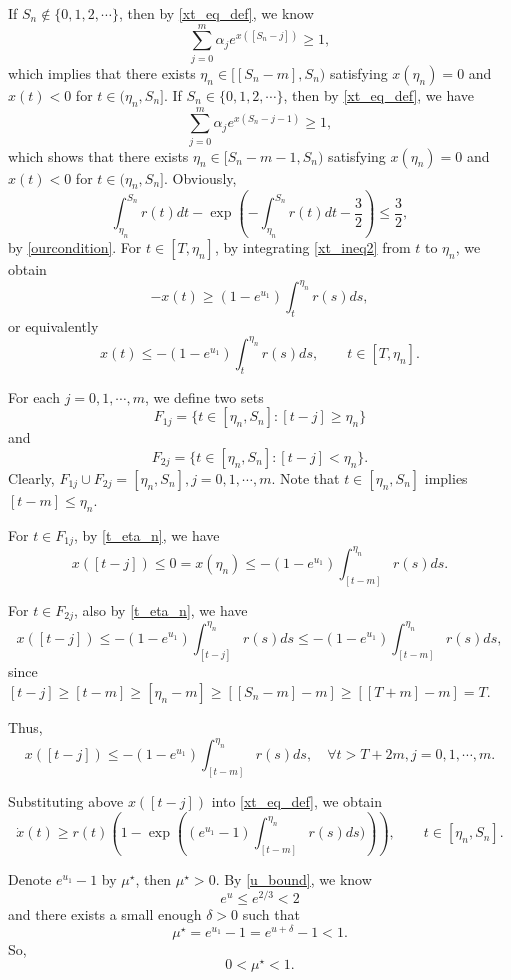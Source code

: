 \documentclass{HZNUMCM}
\begin{document}
If $S_n\notin\{0,1,2,\cdots\}$, then by \eqref{xt_eq_def}, we know
$$
\sum_{j=0}^{m} \alpha_je^{x([S_n-j])}\geqslant1,
$$
which implies that there exists $\eta_n\in [[S_n-m],S_n)$ satisfying $x(\eta_n)=0$ and $x(t)<0$ for $t\in(\eta_n,S_n]$.
If $S_n\in\{0,1,2,\cdots\}$, then by \eqref{xt_eq_def}, we have
$$
\sum_{j=0}^{m} \alpha_je^{x(S_n-j-1)}\geqslant1,
$$which shows that there exists $\eta_n\in [S_n-m-1,S_n)$ satisfying $x(\eta_n)=0$ and $x(t)<0$ for $t\in(\eta_n,S_n]$. Obviously,
\begin{equation}
\int_{\eta_n}^{S_n}r(t)dt-\exp(-\int_{\eta_n}^{S_n}r(t)dt -\frac 3 2)\leqslant \frac 3 2,
\end{equation}
by \eqref{ourcondition}. For $t\in[T,\eta_n]$, by integrating \eqref{xt_ineq2} from $t$ to $\eta_n$, we obtain
$$
-x(t) \geqslant (1-e^{u_1})\int_t^{\eta_n}r(s)ds,
$$
or equivalently
\begin{equation}\label{t_eta_n}
x(t)\leqslant -(1-e^{u_1})\int_t^{\eta_n}r(s)ds,\qquad t\in[T,\eta_n].
\end{equation}

For each $j=0,1,\cdots,m$, we define two sets
$$
F_{1j}=\{t\in[\eta_n,S_n]:[t-j]\geqslant \eta_n\}
$$and$$
F_{2j}=\{t\in[\eta_n,S_n]:[t-j]< \eta_n\}.
$$
Clearly, $F_{1j}\cup F_{2j}=[\eta_n,S_n], j=0,1,\cdots,m$. Note that $t\in[\eta_n,S_n]$ implies $[t-m]\leqslant\eta_n$.

For $t\in F_{1j}$, by \eqref{t_eta_n}, we have
$$
x([t-j])\leqslant 0= x(\eta_n)\leqslant  -(1-e^{u_1})\int_{[t-m]}^{\eta_n}r(s)ds.
$$

For $t\in F_{2j}$, also by \eqref{t_eta_n}, we have
$$
x([t-j])\leqslant  -(1-e^{u_1})\int_{[t-j]}^{\eta_n}r(s)ds\leqslant-(1-e^{u_1})\int_{[t-m]}^{\eta_n}r(s)ds,
$$
since $[t-j]\geqslant [t-m]\geqslant [\eta_n-m]\geqslant [[S_n-m]-m]\geqslant [[T+m]-m]=T$.

Thus,
$$
x([t-j])\leqslant-(1-e^{u_1})\int_{[t-m]}^{\eta_n}r(s)ds,\quad \forall t>T+2m,j=0,1,\cdots,m.
$$

Substituting above $x([t-j])$ into \eqref{xt_eq_def}, we obtain
\begin{equation}\label{xt_eq_def_2}
{\dot x(t)}\geqslant r(t)(1-\exp({(e^{u_1}-1)\int_{[t-m]}^{\eta_n}r(s)ds)})),\qquad t\in[\eta_n,S_n].
\end{equation}


Denote $e^{u_1}-1$ by $\mu^\star$, then $\mu^\star>0$.
By \eqref{u_bound}, we know
$$
e^u\leqslant e^{2/3}<2
$$
and there exists a small enough $\delta>0$ such that $$\mu^\star=e^{u_1}-1=e^{u+\delta}-1<1.$$
So,
\begin{equation}\label{mu_range}
0<\mu^\star<1.
\end{equation}
\end{document}
